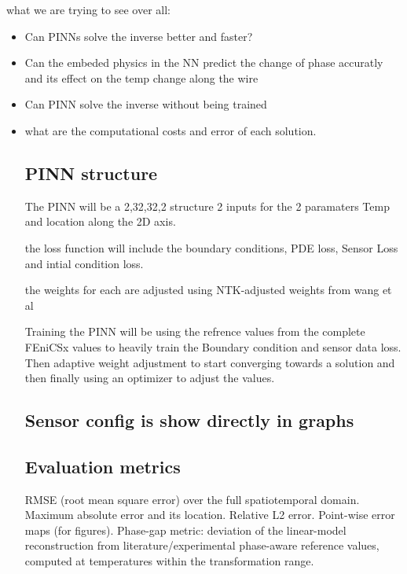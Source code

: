 \documentclass[12pt, a4paper]{article}
\begin{document}
what we are trying to see over all:
\begin{itemize}
    \item Can PINNs solve the inverse better and faster?
    \item Can the embeded physics in the NN predict the change of phase accuratly and its effect on the temp change along the wire
    \item Can PINN solve the inverse without being trained
    \item what are the computational costs and error of each solution.

\subsection{PINN structure}

The PINN will be a 2,32,32,2 structure 2 inputs for the 2 paramaters Temp and location along the 2D axis. 

the loss function will include the boundary conditions, PDE loss, Sensor Loss and intial condition loss. 

the weights for each are adjusted using NTK-adjusted weights from wang et al

Training the PINN will be using the refrence values from the complete FEniCSx values to heavily train the Boundary condition and sensor data loss. Then adaptive weight adjustment to start converging towards a solution and then finally using an optimizer to adjust the values. 

\subsection{Sensor config is show directly in graphs }


\subsection{Evaluation metrics}
RMSE (root mean square error) over the full spatiotemporal domain. Maximum absolute error and its location. Relative L2 error. Point-wise error maps (for figures).
 Phase-gap metric: deviation of the linear-model reconstruction from literature/experimental phase-aware reference values, computed at temperatures within the transformation range.
    
\end{itemize}
    
\end{document}

